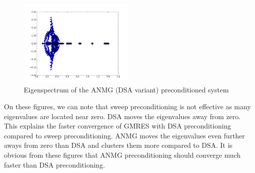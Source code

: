 \begin{figure}[H]
  \centering
  \includegraphics[width=0.5\textwidth]{./Anmg/p_s8_5_5}
  \caption{Eigenspectrum of the ANMG (DSA variant) preconditioned system}
  \label{eig_anmg}
\end{figure}
On these figures, we can note that sweep preconditioning is not effective as
many eigenvalues are located near zero. DSA moves the eigenvalues away from
zero. This explains the faster convergence of GMRES with DSA preconditioning
compared to sweep preconditioning. ANMG moves the eigenvalues even further
aways from zero than DSA and clusters them more compared to DSA. It is obvious
from these figures that ANMG preconditioning should converge much faster than
DSA preconditioning.

